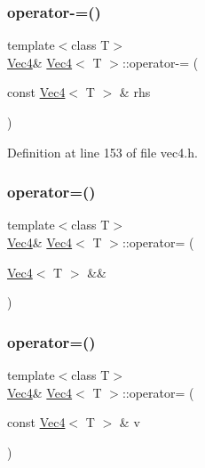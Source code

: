 \subsubsection{\texorpdfstring{operator-\/=()}{operator-=()}}
{\footnotesize\ttfamily template$<$class T$>$ \\
\mbox{\hyperlink{class_vec4}{Vec4}}\& \mbox{\hyperlink{class_vec4}{Vec4}}$<$ T $>$\+::operator-\/= (\begin{DoxyParamCaption}\item[{const \mbox{\hyperlink{class_vec4}{Vec4}}$<$ T $>$ \&}]{rhs }\end{DoxyParamCaption})\hspace{0.3cm}{\ttfamily [inline]}}



Definition at line 153 of file vec4.\+h.

\mbox{\label{class_vec4_a351bc33888f0a3008b90f83c028cdf8a}} 
\subsubsection{\texorpdfstring{operator=()}{operator=()}\hspace{0.1cm}{\footnotesize\ttfamily [1/2]}}
{\footnotesize\ttfamily template$<$class T$>$ \\
\mbox{\hyperlink{class_vec4}{Vec4}}\& \mbox{\hyperlink{class_vec4}{Vec4}}$<$ T $>$\+::operator= (\begin{DoxyParamCaption}\item[{\mbox{\hyperlink{class_vec4}{Vec4}}$<$ T $>$ \&\&}]{ }\end{DoxyParamCaption})\hspace{0.3cm}{\ttfamily [default]}}

\mbox{\label{class_vec4_a2dff6e3360af190d819eceda32bcfd11}} 
\subsubsection{\texorpdfstring{operator=()}{operator=()}\hspace{0.1cm}{\footnotesize\ttfamily [2/2]}}
{\footnotesize\ttfamily template$<$class T$>$ \\
\mbox{\hyperlink{class_vec4}{Vec4}}\& \mbox{\hyperlink{class_vec4}{Vec4}}$<$ T $>$\+::operator= (\begin{DoxyParamCaption}\item[{const \mbox{\hyperlink{class_vec4}{Vec4}}$<$ T $>$ \&}]{v }\end{DoxyParamCaption})\hspace{0.3cm}{\ttfamily [inline]}}



